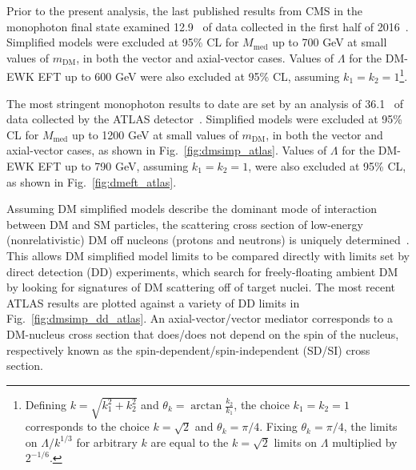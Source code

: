\documentclass[oneside, letterpaper, 12pt, oldfontcommands]{memoir}
\begin{document}
Prior to the present analysis, the last published results from CMS in the monophoton final state examined 12.9 \fbinv\ of data collected in the first half
of 2016~\cite{ref:JHEP10(2017)073}. Simplified models were excluded at 95\% CL for $M_\mathrm{med}$ up to 700 GeV at small values of $m_\mathrm{DM}$, in both the vector
and axial-vector cases. Values of $\Lambda$ for the DM-EWK EFT up to 600 GeV were also excluded at 95\% CL, assuming $k_{1} = k_{2} = 1$\footnote{Defining $k = \sqrt{k_{1}^{2} + k_{2}^{2}}$
and $\theta_{k} = \arctan{\frac{k_{2}}{k_{1}}}$, the choice $k_{1} = k_{2} = 1$ corresponds to the choice $k = \sqrt{2}$ and $\theta_{k} = \pi/4$. Fixing $\theta_{k} = \pi/4$,
the limits on $\Lambda / k^{1/3}$ for arbitrary $k$ are equal to the $k = \sqrt{2}$ limits on $\Lambda$ multiplied by $2^{-1/6}$.}.

The most stringent monophoton results to date are set by an analysis of 36.1 \fbinv\ of data collected by the ATLAS detector~\cite{ref:epjc/s10052-017-4965-8}.
Simplified models were excluded at 95\% CL for $M_\mathrm{med}$ up to 1200 GeV at small values of $m_\mathrm{DM}$, in both the vector and axial-vector cases, as shown in Fig.~\ref{fig:dmsimp_atlas}.
Values of $\Lambda$ for the DM-EWK EFT up to 790 GeV, assuming $k_{1} = k_{2} = 1$, were also excluded at 95\% CL, as shown in Fig.~\ref{fig:dmeft_atlas}.

Assuming DM simplified models describe the dominant mode of interaction between DM and SM particles, the scattering cross section of low-energy (nonrelativistic) DM off nucleons (protons and neutrons)
is uniquely determined~\cite{ref:1603.04156}. This allows DM simplified model limits to be compared directly with limits set by direct detection (DD) experiments, which search for freely-floating
ambient DM by looking for signatures of DM scattering off of target nuclei.
The most recent ATLAS results are plotted against a variety of DD limits in Fig.~\ref{fig:dmsimp_dd_atlas}. An axial-vector/vector mediator corresponds to a DM-nucleus cross section
that does/does not depend on the spin of the nucleus, respectively known as the spin-dependent/spin-independent (SD/SI) cross section.
\end{document}
